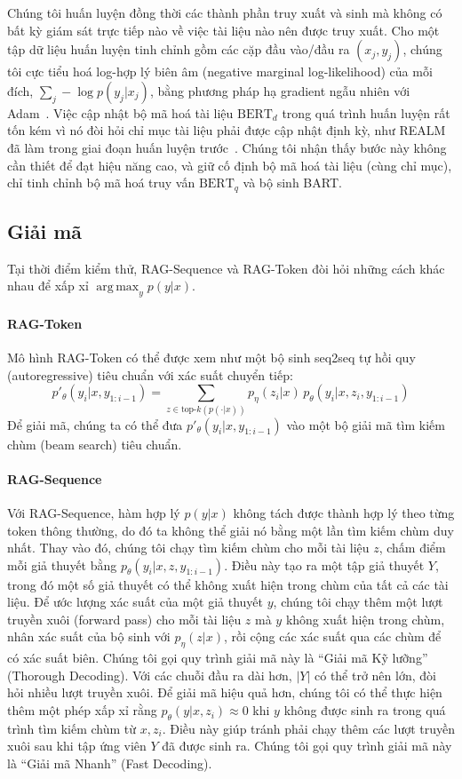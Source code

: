 \documentclass[10pt,letterpaper]{article}
\newcommand{\topk}{\text{top-}k(p(\cdot|x))}
\begin{document}
Chúng tôi huấn luyện đồng thời các thành phần truy xuất và sinh mà không có bất
kỳ giám sát trực tiếp nào về việc tài liệu nào nên được truy xuất. Cho một tập
dữ liệu huấn luyện tinh chỉnh gồm các cặp đầu vào/đầu ra $(x_j, y_j)$, chúng
tôi cực tiểu hoá log-hợp lý biên âm (negative marginal log-likelihood) của mỗi
đích, $\sum_j -\log p(y_j|x_j)$, bằng phương pháp hạ gradient ngẫu nhiên với
Adam~\cite{b28}. Việc cập nhật bộ mã hoá tài liệu $\text{BERT}_d$ trong quá
trình huấn luyện rất tốn kém vì nó đòi hỏi chỉ mục tài liệu phải được cập nhật
định kỳ, như REALM đã làm trong giai đoạn huấn luyện trước~\cite{b20}. Chúng
tôi nhận thấy bước này không cần thiết để đạt hiệu năng cao, và giữ cố định bộ
mã hoá tài liệu (cùng chỉ mục), chỉ tinh chỉnh bộ mã hoá truy vấn
$\text{BERT}_q$ và bộ sinh BART.

\subsection{Giải mã}

Tại thời điểm kiểm thử, RAG-Sequence và RAG-Token đòi hỏi những cách khác nhau
để xấp xỉ $\operatorname*{arg\,max}_y p(y|x)$.

\paragraph{RAG-Token}
Mô hình RAG-Token có thể được xem như một bộ sinh seq2seq tự hồi quy
(autoregressive) tiêu chuẩn với xác suất chuyển tiếp:
\[
  p'_\theta(y_i|x,y_{1:i-1}) = \sum_{z\in\topk} p_\eta(z_i|x)\,
  p_\theta(y_i|x,z_i,y_{1:i-1})
\]
Để giải mã, chúng ta có thể đưa $p'_\theta(y_i|x,y_{1:i-1})$ vào một bộ giải
mã tìm kiếm chùm (beam search) tiêu chuẩn.

\paragraph{RAG-Sequence}
Với RAG-Sequence, hàm hợp lý $p(y|x)$ không tách được thành hợp lý theo từng
token thông thường, do đó ta không thể giải nó bằng một lần tìm kiếm chùm duy
nhất. Thay vào đó, chúng tôi chạy tìm kiếm chùm cho mỗi tài liệu $z$, chấm điểm
mỗi giả thuyết bằng $p_\theta(y_i|x,z,y_{1:i-1})$. Điều này tạo ra một tập giả
thuyết $Y$, trong đó một số giả thuyết có thể không xuất hiện trong chùm của
tất cả các tài liệu. Để ước lượng xác suất của một giả thuyết $y$, chúng tôi
chạy thêm một lượt truyền xuôi (forward pass) cho mỗi tài liệu $z$ mà $y$ không
xuất hiện trong chùm, nhân xác suất của bộ sinh với $p_\eta(z|x)$, rồi cộng các
xác suất qua các chùm để có xác suất biên. Chúng tôi gọi quy trình giải mã này
là ``Giải mã Kỹ lưỡng'' (Thorough Decoding). Với các chuỗi đầu ra dài hơn,
$|Y|$ có thể trở nên lớn, đòi hỏi nhiều lượt truyền xuôi. Để giải mã hiệu quả
hơn, chúng tôi có thể thực hiện thêm một phép xấp xỉ rằng
$p_\theta(y|x,z_i)\approx 0$ khi $y$ không được sinh ra trong quá trình tìm
kiếm chùm từ $x, z_i$. Điều này giúp tránh phải chạy thêm các lượt truyền xuôi
sau khi tập ứng viên $Y$ đã được sinh ra. Chúng tôi gọi quy trình giải mã này
là ``Giải mã Nhanh'' (Fast Decoding).
\end{document}
